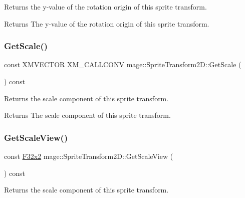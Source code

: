 Returns the y-\/value of the rotation origin of this sprite transform.

\begin{DoxyReturn}{Returns}
The y-\/value of the rotation origin of this sprite transform. 
\end{DoxyReturn}
\mbox{\label{classmage_1_1_sprite_transform2_d_ae2858a4072b37382e82ac883dd80c706}} 
\subsubsection{\texorpdfstring{Get\+Scale()}{GetScale()}}
{\footnotesize\ttfamily const X\+M\+V\+E\+C\+T\+OR X\+M\+\_\+\+C\+A\+L\+L\+C\+O\+NV mage\+::\+Sprite\+Transform2\+D\+::\+Get\+Scale (\begin{DoxyParamCaption}{ }\end{DoxyParamCaption}) const\hspace{0.3cm}{\ttfamily [noexcept]}}

Returns the scale component of this sprite transform.

\begin{DoxyReturn}{Returns}
The scale component of this sprite transform. 
\end{DoxyReturn}
\mbox{\label{classmage_1_1_sprite_transform2_d_aa146848b69ee8334122eddf542d97e37}} 
\subsubsection{\texorpdfstring{Get\+Scale\+View()}{GetScaleView()}}
{\footnotesize\ttfamily const \mbox{\hyperlink{namespacemage_aee4759dedc8def6c6dec26b5c7eddf29}{F32x2}} mage\+::\+Sprite\+Transform2\+D\+::\+Get\+Scale\+View (\begin{DoxyParamCaption}{ }\end{DoxyParamCaption}) const\hspace{0.3cm}{\ttfamily [noexcept]}}

Returns the scale component of this sprite transform.


